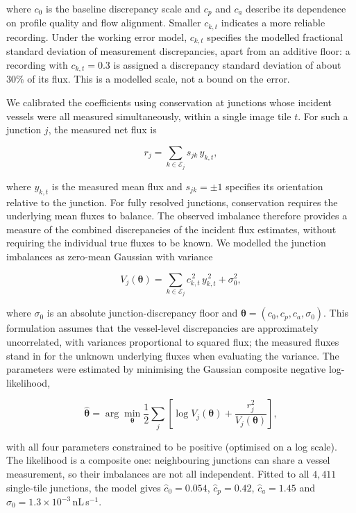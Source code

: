 where $c_0$ is the baseline discrepancy scale and $c_p$ and $c_a$ describe its dependence on profile quality and flow
alignment. Smaller $c_{k,t}$ indicates a more reliable recording. Under the working error model, $c_{k,t}$ specifies the
modelled fractional standard deviation of measurement discrepancies, apart from an additive floor: a recording with $c_{k,t}=0.3$ is assigned a discrepancy standard deviation of about $30\%$ of its flux. This is a modelled
scale, not a bound on the error.

We calibrated the coefficients using conservation at junctions whose incident vessels were all measured
simultaneously, within a single image tile $t$. For such a junction $j$, the measured net flux is

\begin{equation}
r_j
=
\sum_{k\in\mathcal E_j}s_{jk}\,y_{k,t},
\end{equation}

where $y_{k,t}$ is the measured mean flux and $s_{jk}=\pm1$ specifies its orientation relative to the junction. For fully
resolved junctions, conservation requires the underlying mean fluxes to balance. The observed imbalance therefore provides
a measure of the combined discrepancies of the incident flux estimates, without requiring the individual true fluxes to
be known. We modelled the junction imbalances as zero-mean Gaussian
with variance

\begin{equation}
V_j(\boldsymbol\theta)
=
\sum_{k\in\mathcal E_j}
c_{k,t}^{\,2}\,y_{k,t}^{\,2}
+\sigma_0^2,
\label{eq:junction_error_variance}
\end{equation}

where $\sigma_0$ is an absolute junction-discrepancy floor and $\boldsymbol\theta=(c_0,c_p,c_a,\sigma_0)$. This
formulation assumes that the vessel-level discrepancies are approximately uncorrelated, with variances proportional to
squared flux; the measured fluxes stand in for the unknown underlying fluxes when evaluating the variance. The
parameters were estimated by minimising the Gaussian composite negative log-likelihood,

\begin{equation}
\hat{\boldsymbol\theta}
=
\arg\min_{\boldsymbol\theta}
\frac12\sum_j
\left[
\log V_j(\boldsymbol\theta)
+\frac{r_j^2}{V_j(\boldsymbol\theta)}
\right],
\label{eq:uncertainty_calibration_likelihood}
\end{equation}

with all four parameters constrained to be positive (optimised on a log scale). The likelihood is a composite one:
neighbouring junctions can share a vessel measurement, so their imbalances are not all independent. Fitted to all
$4{,}411$ single-tile junctions, the model gives $\hat c_0=0.054$, $\hat c_p=0.42$, $\hat c_a=1.45$ and $\hat\sigma_0=1.3\times10^{-3}$\,nL\,s$^{-1}$.

